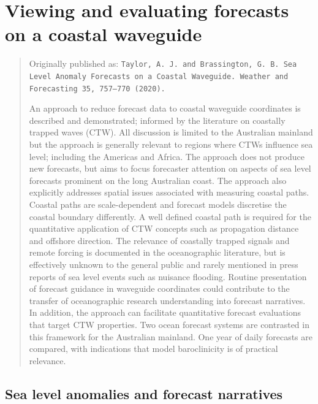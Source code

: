 \chapter{Viewing and evaluating forecasts on a coastal waveguide}
\label{chp:waveguide}
\begin{quote}
{\small
Originally published as: \texttt{Taylor, A. J. and Brassington, G. B. Sea Level Anomaly Forecasts on a Coastal Waveguide. Weather and Forecasting 35, 757–770 (2020).}

An approach to reduce forecast data to coastal waveguide coordinates is described and demonstrated; informed by the literature on coastally trapped waves (CTW).  All discussion is limited to the Australian mainland but the approach is generally relevant to regions where CTWs influence sea level; including the Americas and Africa. The approach does not produce new forecasts, but aims to focus forecaster attention on aspects of sea level forecasts prominent on the long Australian coast.  The approach also explicitly addresses spatial issues associated with measuring coastal paths. 
Coastal paths are scale-dependent and forecast models discretise the coastal boundary differently. 
A well defined coastal path is required for the quantitative application of CTW concepts such as propagation distance and offshore direction.
The relevance of coastally trapped signals and remote forcing is documented in the oceanographic literature, but is effectively unknown to the general public and rarely mentioned in press reports of sea level events such as nuisance flooding.
Routine presentation of forecast guidance in waveguide coordinates could contribute to the transfer of oceanographic research understanding into forecast narratives.
In addition, the approach can facilitate quantitative forecast evaluations that target CTW properties.
Two ocean forecast systems are contrasted in this framework for the Australian mainland.
One year of daily forecasts are compared, with indications that model baroclinicity is of practical relevance.  
}
\end{quote} 

\section{Sea level anomalies and forecast narratives}

